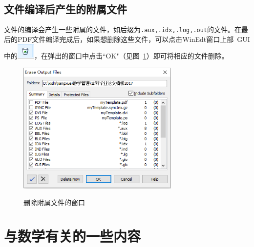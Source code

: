 \subsection{\CTeX{} 文件编译后产生的附属文件}
\CTeX{} 文件的编译会产生一些附属的文件，如后缀为{\tt .aux,.idx,.log,.out}的文件。在最后的PDF文件编译完成后，如果想删除这些文件，可以点击{\rm WinEdt}窗口上部~GUI 中的\includegraphics[width=.4cm]{garbagecan.png}，在弹出的窗口中点击``OK"（见图~\ref{fig:deletewin}）即可将相应的文件删除。
\begin{figure}
	\centering
	\includegraphics[width=8cm]{deletewin.png}\\
	\caption{删除附属文件的窗口}\label{fig:deletewin}
\end{figure}

\section{与数学有关的一些内容}\label{sec:2two}
